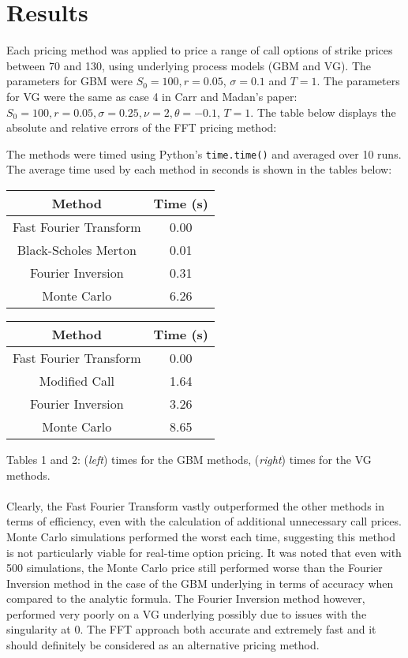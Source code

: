 \documentclass[11pt]{article}
\begin{document}
	\section{Results}
	Each pricing method was applied to price a range of call options of strike prices between 70 and 130, using underlying process models (GBM and VG). The parameters for GBM were \( S_0 = 100, r = 0.05 \), \( \sigma = 0.1 \) and \( T = 1 \). The parameters for VG were the same as case 4 in Carr and Madan's paper: \( S_0 = 100, r = 0.05, \sigma = 0.25, \nu = 2, \theta = -0.1 \), \( T = 1 \). The table below displays the absolute and relative errors of the FFT pricing method:
	
	 
	
	\noindent The methods were timed using Python's \colorbox{gray!25}{\texttt{time.time()}} and averaged over 10 runs. The average time used by each method in seconds is shown in the tables below:
	\begin{center}
		\begin{tabular}{cc}
			\hline
			\hline
			\textbf{Method} & \textbf{Time (s)}\\
			\hline
			Fast Fourier Transform & 0.00\\
			Black-Scholes Merton & 0.01 \\
			Fourier Inversion & 0.31 \\
			Monte Carlo & 6.26 \\
			\hline
			\end{tabular}\hspace{1cm}
		\begin{tabular}{cc}
			\hline
			\hline
			\textbf{Method} & \textbf{Time (s)}\\
			\hline
			Fast Fourier Transform & 0.00\\
			Modified Call & 1.64 \\
			Fourier Inversion & 3.26 \\
			Monte Carlo & 8.65 \\
			\hline
		\end{tabular}
	\end{center}
	Tables 1 and 2: (\textit{left}) times for the GBM methods, (\textit{right}) times for the VG methods.\\\\
	Clearly, the Fast Fourier Transform vastly outperformed the other methods in terms of efficiency, even with the calculation of additional unnecessary call prices. Monte Carlo simulations performed the worst each time, suggesting this method is not particularly viable for real-time option pricing. It was noted that even with 500 simulations, the Monte Carlo price still performed worse than the Fourier Inversion method in the case of the GBM underlying in terms of accuracy when compared to the analytic formula. The Fourier Inversion method however, performed very poorly on a VG underlying possibly due to issues with the singularity at 0. The FFT approach both accurate and extremely fast and it should definitely be considered as an alternative pricing method. 
		
\end{document}
